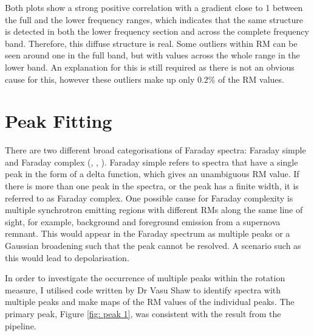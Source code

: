 Both plots show a strong positive correlation with a gradient close to 1 between the full and the lower frequency ranges, which indicates that the same structure is detected in both the lower frequency section and across the complete frequency band. Therefore, this diffuse structure is real. Some outliers within RM can be seen around one in the full band, but with values across the whole range in the lower band. An explanation for this is still required as there is not an obvious cause for this, however these outliers make up only $0.2\%$ of the RM values.


\section{Peak Fitting}

There are two different broad categorisations of Faraday spectra: Faraday simple and Faraday complex (\cite{Alger_Livingston_McClure-Griffiths_Nabaglo_Wong_Ong_2021}, \cite{thomson2023rapidaskapcontinuumsurvey}, \cite{vanderwoude2024prototypefaradayrotationmeasure}). Faraday simple refers to spectra that have a single peak in the form of a delta function, which gives an unambiguous RM value. If there is more than one peak in the spectra, or the peak has a finite width, it is referred to as Faraday complex. One possible cause for Faraday complexity is multiple synchrotron emitting regions with different RMs along the same line of sight, for example, background and foreground emission from a supernova remnant. This would appear in the Faraday spectrum as multiple peaks or a Gaussian broadening such that the peak cannot be resolved. A scenario such as this would lead to depolarisation. 

In order to investigate the occurrence of multiple peaks within the rotation measure, I utilised code written by Dr Vasu Shaw
to identify spectra with multiple peaks and make maps of the RM values of the individual peaks. 
The primary peak, Figure \ref{fig: peak 1}, was consistent with the result from the pipeline.

